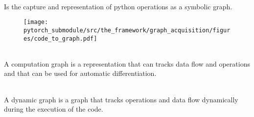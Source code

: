 \begin{defnbox}\nospacing
    \begin{defn}\label{defn:symbolic_tracing}\leavevmode\\
        \begin{minipage}[c]{0.52\textwidth}
            Is the capture and representation of python operations as a symbolic graph.
        \end{minipage}\hfil
        \begin{minipage}{0.4\textwidth}
            \begin{figure}[H]
                \centering
                \texttt{[image: pytorch\_submodule/src/the\_framework/graph\_acquisition/figures/code\_to\_graph.pdf]}
            \end{figure}
        \end{minipage}
    \end{defn}
\end{defnbox}

\begin{defnbox}\nospacing
    \begin{defn}\label{defn:computation_graph}\leavevmode\\
        A computation graph is a representation that can tracks data flow and operations and that can be used for automatic differentiation.
    \end{defn}
\end{defnbox}
\begin{defnbox}\nospacing
    \begin{defn}\label{defn:dynamic_graph_computation}\leavevmode\\
        A dynamic graph is a graph that tracks operations and data flow dynamically during the execution of the code.
    \end{defn}
\end{defnbox}


